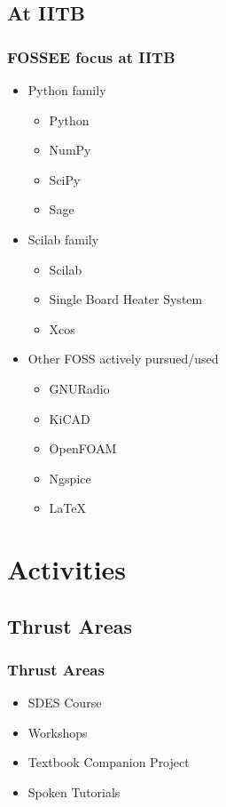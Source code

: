 \documentclass[compress,red]{beamer} %
\begin{document}
\subsection{At IITB}
\begin{frame}
\frametitle{FOSSEE focus at IITB}
\begin{itemize}
\item Python family \pause
   \begin{itemize}
   \item Python
   \item NumPy
   \item SciPy
   \item Sage \pause
   \end{itemize}
\item Scilab family \pause
   \begin{itemize}
   \item Scilab
   \item Single Board Heater System
   \item Xcos \pause
   \end{itemize}
\item Other FOSS actively pursued/used \pause
   \begin{itemize}
   \item GNURadio
   \item KiCAD
   \item OpenFOAM
   \item Ngspice
   \item \LaTeX %
   \end{itemize}
\end{itemize}
\end{frame}

\section{Activities}

\subsection{Thrust Areas}
\begin{frame}
\frametitle{Thrust Areas}
\begin{itemize}
\item SDES Course \pause
\item Workshops  \pause
\item Textbook Companion Project  \pause
\item Spoken Tutorials \pause
\end{itemize}
\end{frame}
\end{document}
